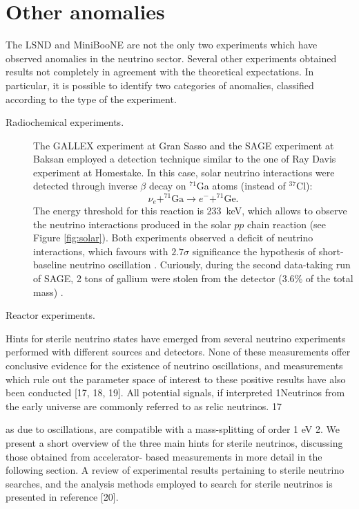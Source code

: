 \section{Other anomalies}
The LSND and MiniBooNE are not the only two experiments which have observed anomalies in the neutrino sector. Several other experiments obtained results not completely in agreement with the theoretical expectations. In particular, it is possible to identify two categories of anomalies, classified according to the type of the experiment.
\begin{description}
    \item[Radiochemical experiments.] The GALLEX experiment at Gran Sasso and the SAGE experiment at Baksan employed a detection technique similar to the one of Ray Davis experiment at Homestake. In this case, solar neutrino interactions were detected through inverse $\beta$ decay on $^{71}$Ga atoms (instead of $^{37}$Cl):
    \begin{equation}
        \nu_e + ^{71}\mathrm{Ga} \rightarrow e^- + ^{71}\mathrm{Ge}.
    \end{equation}
    The energy threshold for this reaction is 233~keV, which allows to observe the neutrino interactions produced in the solar $pp$ chain reaction (see Figure \ref{fig:solar}). Both experiments observed a deficit of neutrino interactions, which favours with $2.7\sigma$ significance the hypothesis of short-baseline neutrino oscillation \cite{Giunti:2010zu}. Curiously, during the second data-taking run of SAGE, 2 tons of gallium were stolen from the detector (3.6\% of the total mass) \cite{Abdurashitov:1999zd}.
    
    \item[Reactor experiments.]
\end{description} 

Hints for sterile neutrino states have emerged from several neutrino experiments performed with different sources and detectors. None of these measurements offer conclusive evidence for the existence of neutrino oscillations, and measurements which rule out the parameter space of interest to these positive results have also been conducted [17, 18, 19]. All potential signals, if interpreted
1Neutrinos from the early universe are commonly referred to as relic neutrinos. 17
 
as due to oscillations, are compatible with a mass-splitting of order 1 eV 2. We present a short overview of the three main hints for sterile neutrinos, discussing those obtained from accelerator- based measurements in more detail in the following section. A review of experimental results pertaining to sterile neutrino searches, and the analysis methods employed to search for sterile neutrinos is presented in reference [20].

